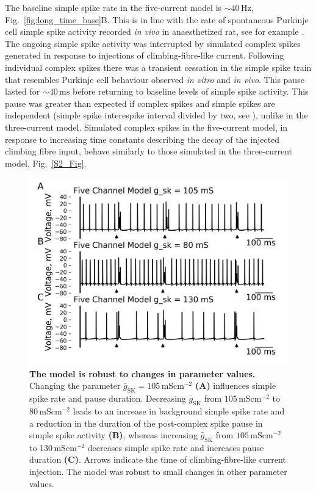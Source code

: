 \documentclass[twocolumn]{svjour3}          %
\newcommand{\msi}{\,\mathrm{mS cm^{-2}}}
\newcommand{\mse}{\,\mathrm{ms}}
\newcommand{\hz}{\,\mathrm{Hz}}
\newcommand{\sk}{\mathrm{SK}}
\begin{document}
The baseline simple spike rate in the five-current model is $\sim
40\hz$, Fig.~\ref{fig:long_time_base}B. This is in line with the rate
of spontaneous Purkinje cell simple spike activity recorded \textit{in
  vivo} in anaesthetized rat, see for example \citet{BurroughsEtAl2016}.  The ongoing simple spike activity was interrupted by simulated complex spikes generated in response to injections of
climbing-fibre-like current. Following individual complex spikes there
was a transient cessation in the simple spike train that resembles
Purkinje cell behaviour observed \textit{in vitro} and \textit{in
  vivo}. This pause lasted for $\sim 40\mse$ before returning to
baseline levels of simple spike activity. This pause was greater than
expected if complex spikes and simple spikes are independent (simple
spike interespike interval divided by two, see \citet{XiaoEtAl2014}),
unlike in the three-current model. Simulated complex spikes in the
five-current model, in response to increasing time constants
describing the decay of the injected climbing fibre input, behave
similarly to those simulated in the three-current model,
Fig.~\ref{S2_Fig}.



\begin{figure}[!ht]
  \includegraphics[width=\linewidth]{Figure7.png}
\caption{\textbf{The model is robust to changes in parameter values.}
 Changing the parameter $\bar{g}_\sk=105\msi$ \textbf{(A)} influences simple
  spike rate and pause duration. Decreasing $\bar{g}_\sk$ from
  $105\msi$ to 80$\msi$ leads to an increase in background simple spike
  rate and a reduction in the duration of the post-complex spike pause
  in simple spike activity \textbf{(B)}, whereas increasing
  $\bar{g}_\sk$ from $105\msi$ to 130$\msi$ decreases simple spike rate
  and increases pause duration \textbf{(C)}. Arrows indicate the time
  of climbing-fibre-like current injection. The model was robust to
  small changes in other parameter values.}
\label{S3_Fig}
\end{figure}
\end{document}
